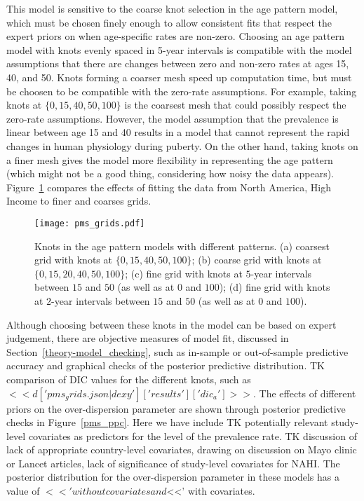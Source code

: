 This model is sensitive to the coarse knot selection in the age
pattern model, which must be chosen finely enough to allow consistent
fits that respect the expert priors on when age-specific rates are
non-zero.  Choosing an age pattern model with knots evenly spaced in
5-year intervals is compatible with the model assumptions that there
are changes between zero and non-zero rates at ages 15, 40, and 50.
Knots forming a coarser mesh speed up computation time, but must be
choosen to be compatible with the zero-rate assumptions.  For example,
taking knots at $\{0,15,40,50,100\}$ is the coarsest mesh that could
possibly respect the zero-rate assumptions.  However, the model
assumption that the prevalence is linear between age 15 and 40 results
in a model that cannot represent the rapid changes in human physiology
during puberty.  On the other hand, taking knots on a finer mesh gives
the model more flexibility in representing the age pattern (which
might not be a good thing, considering how noisy the data appears).
Figure~\ref{pms_grids} compares the effects of fitting the data from
North America, High Income to finer and coarses grids.
\begin{figure}
\begin{center}
\texttt{[image: pms\_grids.pdf]}
\end{center}
\caption{Knots in the age pattern models with different patterns. (a)
  coarsest grid with knots at $\{0,15,40,50,100\}$; (b) coarse grid
  with knots at $\{0,15,20,40,50,100\}$; (c) fine grid with knots at
  $5$-year intervals between $15$ and $50$ (as well as at $0$ and
  $100$); (d) fine grid with knots at $2$-year intervals between $15$
  and $50$ (as well as at $0$ and $100$).}
\label{pms_grids}
\end{figure}

Although choosing between these knots in the model can be based on
expert judgement, there are objective measures of model fit, discussed
in Section~\ref{theory-model_checking}, such as in-sample or
out-of-sample predictive accuracy and graphical checks of the
posterior predictive distribution. TK comparison of DIC values for the
different knots, such as $<<d['pms_grids.json|dexy']['results']['dic_a']>>$.
The effects of different priors on the over-dispersion parameter are shown through posterior predictive checks in
Figure~\ref{pms_ppc}.  Here we have include TK potentially relevant study-level
covariates as predictors for the level of the prevalence rate.  TK
discussion of lack of appropriate country-level covariates, drawing on
discussion on Mayo clinic or Lancet articles, lack of significance of study-level covariates for NAHI. The posterior distribution for the over-dispersion parameter in
these models has a value of
$<<'%
without covariates and
$<<'%
with covariates.

